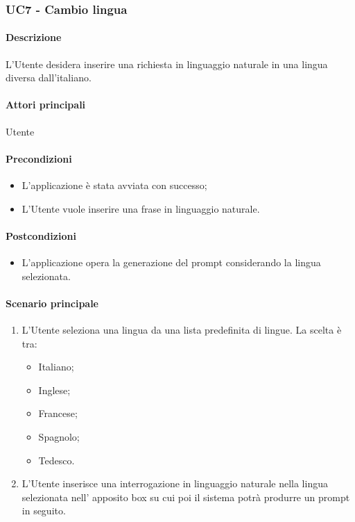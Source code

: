 \subsubsection{UC7 - Cambio lingua}\label{UC7}
\paragraph*{Descrizione}
L’Utente desidera inserire una richiesta in linguaggio naturale in una lingua diversa dall’italiano.

\paragraph*{Attori principali}
Utente

\paragraph*{Precondizioni}
\begin{itemize}
  \item L'applicazione è stata avviata con successo;
  \item L’Utente vuole inserire una frase in linguaggio naturale.
\end{itemize}

\paragraph*{Postcondizioni}
\begin{itemize}
  \item L'applicazione opera la generazione del prompt considerando la lingua selezionata.
\end{itemize}

\paragraph*{Scenario principale}
\begin{enumerate}
  \item L’Utente seleziona una lingua da una lista predefinita di lingue. La scelta è tra:
    \begin{itemize}
      \item Italiano;
      \item Inglese;
      \item Francese;
      \item Spagnolo;
      \item Tedesco.
    \end{itemize}
  \item L’Utente inserisce una interrogazione in linguaggio naturale nella lingua selezionata nell’ apposito box su cui poi il sistema potrà produrre un prompt in seguito. 
\end{enumerate}

